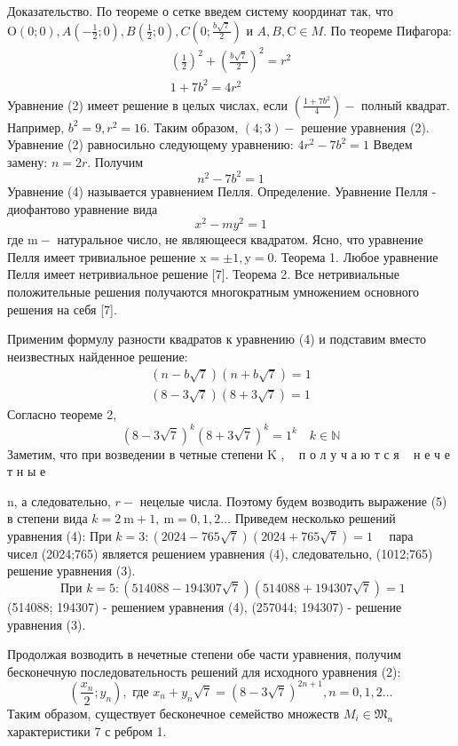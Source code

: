 \documentclass[a4paper,openbib]{article}
\begin{document}
Доказательство. По теореме о сетке введем систему координат так, что $\mathrm{O}(0 ; 0), A\left(-\frac{1}{2} ; 0\right), B\left(\frac{1}{2} ; 0\right), C\left(0 ; \frac{{b} \sqrt{7}}{2}\right)$ и $A, B, \mathrm{C} \in M .$ По теореме
Пифагора:
$$
\begin{array}{c}
\left(\frac{1}{2}\right)^{2}+\left(\frac{b \sqrt{7}}{2}\right)^{2}=r^{2} \\
1+7 b^{2}=4 r^{2}
\end{array}
$$
Уравнение (2) имеет решение в целых числах, если $\left(\frac{1+7 b^{2}}{4}\right)-$ полный квадрат. Например, $b^{2}=9, {r}^{2}=16 .$ Таким образом, $(4 ; 3)-$ решение уравнения (2).
Уравнение (2) равносильно следующему уравнению:
$4 r^{2}-7 b^{2}=1$
Введем замену: $n=2 r .$ Получим
$$
n^{2}-7 b^{2}=1
$$
Уравнение (4) называется уравнением Пелля. Определение. Уравнение Пелля - диофантово уравнение вида
$$
x^{2}-m y^{2}=1
$$
где $\mathrm{m}-$ натуральное число, не являющееся квадратом. Ясно, что уравнение Пелля имеет тривиальное решение $\mathrm{x}=\pm 1, \mathrm{y}=0 .$ Теорема 1. Любое уравнение Пелля имеет нетривиальное решение [7]. Теорема 2. Все нетривиальные положительные решения получаются многократным умножением основного решения на себя [7].

Применим формулу разности квадратов к уравнению (4) и подставим вместо неизвестных найденное решение:
$$
\begin{array}{l}
(n-b \sqrt{7})(n+b \sqrt{7})=1 \\
(8-3 \sqrt{7})(8+3 \sqrt{7})=1
\end{array}
$$
Согласно теореме 2,
$$
(8-3 \sqrt{7})^{{k}}(8+3 \sqrt{7})^{{k}}=1^{{k}} \quad {k} \in \mathbb{N}
$$
Заметим, что при возведении в четные степени \textrm{K} , ~ п о л у ч а ю т с я ~ н е ч е т н ы е ~

n, а следовательно, $r-$ нецелые числа. Поэтому будем возводить выражение
(5) в степени вида ${k}=2 \mathrm{~m}+1, \mathrm{~m}=0,1,2 \ldots$
Приведем несколько решений уравнения (4):
При ${k}=3:(2024-765 \sqrt{7})(2024+765 \sqrt{7})=1 \quad$ пара $\quad$ чисел
(2024;765) является решением уравнения (4), следовательно, (1012;765) решение уравнения (3).
$$
\text { При } {k}=5:(514088-194307 \sqrt{7})(514088+194307 \sqrt{7})=1
$$
(514088; 194307) - решением уравнения (4), (257044; 194307) - решение уравнения (3).

Продолжая возводить в нечетные степени обе части уравнения, получим бесконечную последовательность решений для исходного уравнения (2):
$$
\left(\frac{x_{n}}{2} ; y_{n}\right), \text { где } x_{n}+y_{n} \sqrt{7}=(8-3 \sqrt{7})^{2 n+1}, n=0,1,2 \ldots
$$
Таким образом, существует бесконечное семейство множеств $M_{i} \in \mathfrak{M}_{n}$ характеристики 7 с ребром 1.
\end{document}
